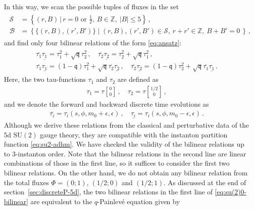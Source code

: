 \documentclass[11pt, a4paper]{article}
\newcommand{\tauftn}[2]{\tau\genfrac[]{0pt}{1}{#1}{#2}}
\theoremstyle{definition}
\begin{document}
In this way, we scan the possible tuples of fluxes in the set
\begin{align}
    \begin{aligned}
        \mathcal{S} &= \left\{ (r,B) \, \bigg| \, r=0 \text{ or } \frac{1}{2}, \ B  \in \mathbb{Z} , \ |B| \leq 5 \right\} \, , \\
        \mathcal{B} &= \left\{ \{(r,B),(r',B')\} \mid (r,B), (r',B') \in \mathcal{S} , \ r+r'\in \mathbb{Z} , \ B+B' = 0 \, \right\} \, ,
    \end{aligned}
\end{align}
and find only four bilinear relations of the form \eqref{eq:ansatz}:
\begin{gather}\label{eq:su(2)0-bilinear}
    \begin{gathered}
    \overline{\tau_1} \underline{\tau_1} = \tau_1^2 + \sqrt{\mathfrak{q}} \tau_2^2 \, , \quad
    \overline{\tau_2} \underline{\tau_2} = \tau_2^2 + \sqrt{\mathfrak{q}} \tau_1^2 \, , \\
    \overline{\tau_1} \underline{\tau_1} = (1-\mathfrak{q}) \tau_1^2 + \sqrt{\mathfrak{q}} \overline{\tau_2}{\underline{\tau_2}} \, , \quad
    \overline{\tau_2} \underline{\tau_2} = (1-\mathfrak{q}) \tau_2^2 + \sqrt{\mathfrak{q}} \overline{\tau_1}{\underline{\tau_1}} \, .
    \end{gathered}
\end{gather}
Here, the two tau-functions $ \tau_1 $ and $ \tau_2 $ are defined as
\begin{align}
    \tau_1 = \tauftn{0}{0} \, , \quad
    \tau_2 = \tauftn{1/2}{0} \, ,
\end{align}
and we denote the forward and backward discrete time evolutions as
\begin{align}
    \overline{\tau_i} = \tau_i(s,\phi,m_0+\epsilon,\epsilon) \, , \quad
    \underline{\tau_i} = \tau_i(s,\phi,m_0-\epsilon,\epsilon) \, .
\end{align}
Although we derive these relations from the classical and perturbative data of the 5d $ \mathrm{SU}(2) $ gauge theory, they are compatible with the instanton partition function \eqref{eq:su2-adhm}. We have checked the validity of the bilinear relations up to 3-instanton order. Note that the bilinear relations in the second line are linear combinations of those in the first line, so it suffices to consider the first two bilinear relations. On the other hand, we do not obtain any bilinear relation from the total fluxes $ \Phi= (0;1) $, $ (1/2; 0) $ and $ (1/2;1) $. As discussed at the end of section~\ref{sec:discreteP-5d}, the two bilinear relations in the first line of \eqref{eq:su(2)0-bilinear} are equivalent to the $ q $-Painlev\'e equation given by
\end{document}
